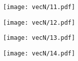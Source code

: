 \documentclass{article}
\begin{document}
\begin{figure}[H]
\centering
\begin{subfigure}{.49\textwidth}
\texttt{[image: vecN/11.pdf]}
\end{subfigure}
\begin{subfigure}{.49\textwidth}
\texttt{[image: vecN/12.pdf]}
\end{subfigure}
\end{figure}
\begin{figure}[H]
\centering
\begin{subfigure}{.49\textwidth}
\texttt{[image: vecN/13.pdf]}
\end{subfigure}
\begin{subfigure}{.49\textwidth}
\texttt{[image: vecN/14.pdf]}
\end{subfigure}
\end{figure}
\end{document}
